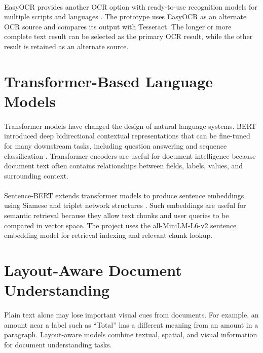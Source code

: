 \paragraph{} EasyOCR provides another OCR option with ready-to-use recognition models for multiple scripts and languages \cite{easyocr2026}. The prototype uses EasyOCR as an alternate OCR source and compares its output with Tesseract. The longer or more complete text result can be selected as the primary OCR result, while the other result is retained as an alternate source.

\section{Transformer-Based Language Models}
\paragraph{} Transformer models have changed the design of natural language systems. BERT introduced deep bidirectional contextual representations that can be fine-tuned for many downstream tasks, including question answering and sequence classification \cite{devlin2019bert}. Transformer encoders are useful for document intelligence because document text often contains relationships between fields, labels, values, and surrounding context.

\paragraph{} Sentence-BERT extends transformer models to produce sentence embeddings using Siamese and triplet network structures \cite{reimers2019sentencebert}. Such embeddings are useful for semantic retrieval because they allow text chunks and user queries to be compared in vector space. The project uses the all-MiniLM-L6-v2 sentence embedding model for retrieval indexing and relevant chunk lookup.

\section{Layout-Aware Document Understanding}
\paragraph{} Plain text alone may lose important visual cues from documents. For example, an amount near a label such as ``Total'' has a different meaning from an amount in a paragraph. Layout-aware models combine textual, spatial, and visual information for document understanding tasks.

